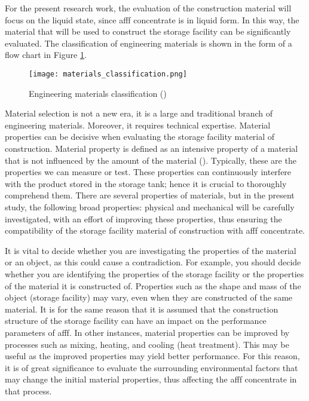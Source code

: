 For the present research work, the evaluation of the construction material will focus on the liquid state, since \acrshort{afff} concentrate is in liquid form. In this way, the material that will be used to construct the storage facility can be significantly evaluated. The classification of engineering materials is shown in the form of a flow chart in Figure \ref{ch3:figure:materials}.

\begin{figure}[H]
    \centering
    \texttt{[image: materials\_classification.png]}
    \caption{Engineering materials classification (\cite{timings2008fabrication})}
    \label{ch3:figure:materials}
\end{figure}

Material selection is not a new era, it is a large and traditional branch of engineering materials. Moreover, it requires technical expertise. Material properties can be decisive when evaluating the storage facility material of construction. Material property is defined as an intensive property of a material that is not influenced by the amount of the material (\cite{mcarthur2004engineering}). Typically, these are the properties we can measure or test. These properties can continuously interfere with the product stored in the storage tank; hence it is crucial to thoroughly comprehend them. There are several properties of materials, but in the present study, the following broad properties: physical and mechanical will be carefully investigated, with an effort of improving these properties, thus ensuring the compatibility of the storage facility material of construction with \acrshort{afff} concentrate.

It is vital to decide whether you are investigating the properties of the material or an object, as this could cause a contradiction. For example, you should decide whether you are identifying the properties of the storage facility or the properties of the material it is constructed of. Properties such as the shape and mass of the object (storage facility) may vary, even when they are constructed of the same material. It is for the same reason that it is assumed that the construction structure of the storage facility can have an impact on the performance parameters of \acrshort{afff}.  In other instances, material properties can be improved by processes such as mixing, heating, and cooling (heat treatment). This may be useful as the improved properties may yield better performance. For this reason, it is of great significance to evaluate the surrounding environmental factors that may change the initial material properties, thus affecting the \acrshort{afff} concentrate in that process.

